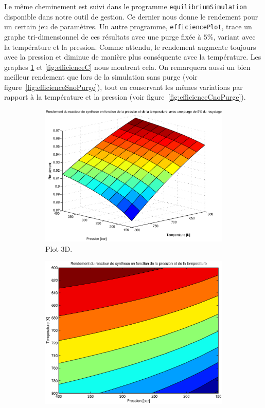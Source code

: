 Le même cheminement est suivi dans le programme \texttt{equilibriumSimulation} 
disponible dans notre outil de gestion. Ce dernier nous donne le rendement pour un
certain jeu de paramètres. Un autre programme, \texttt{efficiencePlot}, trace un graphe
tri-dimensionnel de ces résultats avec une purge fixée à $5\%$,
variant avec la température et la pression. 
Comme attendu, le rendement augmente toujours avec la pression et diminue
de manière plus conséquente avec la température. 
Les graphes \ref{fig:efficienceS} et \ref{fig:efficienceC} nous montrent cela.
On remarquera aussi un bien meilleur rendement que lors
de la simulation sans purge (voir figure~\ref{fig:efficienceSnoPurge}),
tout en conservant les mêmes variations par rapport à la température 
et la pression (voir figure~\ref{fig:efficienceCnoPurge}).

\begin{figure}
	\centering
	\begin{subfigure}[b]{1\textwidth}
		\includegraphics[scale=0.7]{../tache2/img/efficienceSyntheseS.eps}
		\caption{Plot 3D.}
		\label{fig:efficienceS}
	\end{subfigure}
	\begin{subfigure}[b]{0.8\textwidth}
		\includegraphics[scale=0.6]{../tache2/img/efficienceSyntheseC.eps}

\end{subfigure}
\end{figure}
